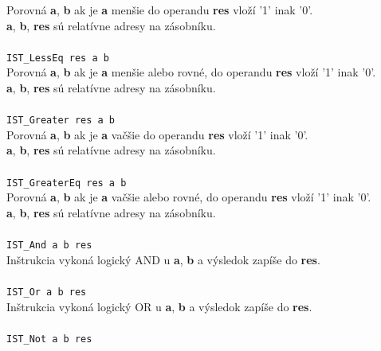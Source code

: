 \documentclass[12pt,a4paper,titlepage,final]{article}
\begin{document}
Porovná \textbf{a}, \textbf{b} ak je \textbf{a} menšie do operandu \textbf{res} vloží '1' inak '0'.\\
\textbf{a}, \textbf{b}, \textbf{res} sú relatívne adresy na zásobníku.\\
\\\texttt{IST\_LessEq res a b}\\
Porovná \textbf{a}, \textbf{b} ak je \textbf{a} menšie alebo rovné, do operandu \textbf{res} vloží '1' inak '0'.\\
\textbf{a}, \textbf{b}, \textbf{res} sú relatívne adresy na zásobníku.\\
\\\texttt{IST\_Greater res a b}\\
Porovná \textbf{a}, \textbf{b} ak je \textbf{a} vačšie do operandu \textbf{res} vloží '1' inak '0'.\\
\textbf{a}, \textbf{b}, \textbf{res} sú relatívne adresy na zásobníku.\\
\\\texttt{IST\_GreaterEq res a b}\\
Porovná \textbf{a}, \textbf{b} ak je \textbf{a} vačšie alebo rovné, do operandu \textbf{res} vloží '1' inak '0'.\\
\textbf{a}, \textbf{b}, \textbf{res} sú relatívne adresy na zásobníku.\\
\\\texttt{IST\_And a b res}\\
Inštrukcia vykoná logický AND u \textbf{a}, \textbf{b} a výsledok zapíše do \textbf{res}.\\
\\\texttt{IST\_Or a b res}\\
Inštrukcia vykoná logický OR u \textbf{a}, \textbf{b} a výsledok zapíše do \textbf{res}.\\
\\\texttt{IST\_Not a b res}\\

\end{document}

